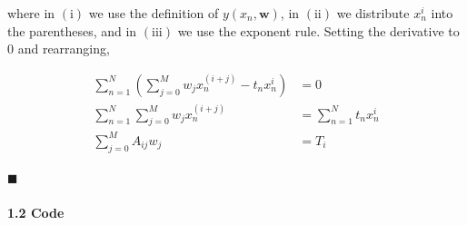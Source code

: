 \documentclass[
  0.875em,
  letterpaper,
  DIV=11,
  numbers=noendperiod]{scrartcl}
\let\oldparagraph\paragraph
\renewcommand{\paragraph}[1]{\oldparagraph{#1}\mbox{}}
\begin{document}
where in \((\text{i})\) we use the definition of \(y(x_n, \mathbf{w})\),
in \((\text{ii})\) we distribute \(x_n^i\) into the parentheses, and in
\((\text{iii})\) we use the exponent rule. Setting the derivative to
\(0\) and rearranging,

\[
\begin{aligned}
\sum_{n=1}^N (\sum_{j=0}^M w_j x_n^{(i+j)} - t_n x_n^i) & = 0 \\
\sum_{n=1}^N \sum_{j=0}^M w_j x_n^{(i+j)} & = \sum_{n=1}^N t_n x_n^i \\
\sum_{j=0}^M A_{ij}w_j &= T_i
\end{aligned}
\]

\(\blacksquare\)

\hypertarget{code}{%
\paragraph{\texorpdfstring{\textbf{1.2 Code}}{1.2 Code}}\label{code}}
\end{document}
